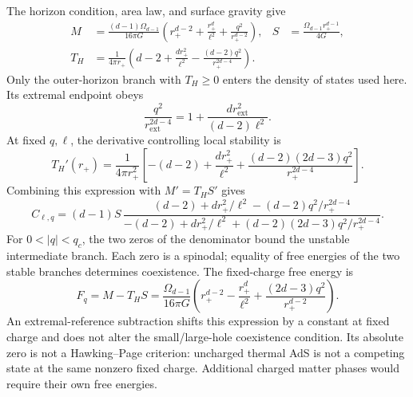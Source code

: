 \documentclass[11pt,letterpaper]{article}
\theoremstyle{plain}
\theoremstyle{definition}
\theoremstyle{remark}
\begin{document}
The horizon condition, area law, and surface gravity give
\begin{align}
 M&=\frac{(d-1)\Omega_{d-1}}{16\pi G}
   \left(r_+^{d-2}+\frac{r_+^d}{\ell^2}
                         +\frac{q^2}{r_+^{d-2}}\right),
 &S&=\frac{\Omega_{d-1}r_+^{d-1}}{4G},
 \label{eq11:charged_mass_entropy}\\
 T_H&=\frac{1}{4\pi r_+}
       \left(d-2+\frac{d r_+^2}{\ell^2}
                    -\frac{(d-2)q^2}{r_+^{2d-4}}\right).
 \label{eq11:charged_temperature}
\end{align}
Only the outer-horizon branch with $T_H\geq0$ enters the density of
states used here.  Its extremal endpoint obeys
\begin{equation}
 \frac{q^2}{r_{\mathrm{ext}}^{2d-4}}
   =1+\frac{d r_{\mathrm{ext}}^2}{(d-2)\ell^2}.
 \label{eq11:extremal_endpoint}
\end{equation}
At fixed $q,\ell$, the derivative controlling local stability is
\begin{equation}
 T_H'(r_+)=\frac{1}{4\pi r_+^2}
 \left[-(d-2)+\frac{d r_+^2}{\ell^2}
       +\frac{(d-2)(2d-3)q^2}{r_+^{2d-4}}\right].
 \label{eq11:charged_temperature_derivative}
\end{equation}
Combining this expression with $M'=T_HS'$ gives
\begin{equation}
 C_{\ell,q}=(d-1)S\,
 \frac{(d-2)+d r_+^2/\ell^2-(d-2)q^2/r_+^{2d-4}}
      {-(d-2)+d r_+^2/\ell^2+(d-2)(2d-3)q^2/r_+^{2d-4}}.
 \label{eq11:charged_capacity}
\end{equation}
For $0<|q|<q_c$, the two zeros of the denominator bound the unstable
intermediate branch.  Each zero is a spinodal; equality of free energies
of the two stable branches determines coexistence.  The fixed-charge
free energy is
\begin{equation}
 F_q=M-T_HS=\frac{\Omega_{d-1}}{16\pi G}
 \left(r_+^{d-2}-\frac{r_+^d}{\ell^2}
                      +\frac{(2d-3)q^2}{r_+^{d-2}}\right).
 \label{eq11:charged_free_energy}
\end{equation}
An extremal-reference subtraction shifts this expression by a constant
at fixed charge and does not alter the small/large-hole coexistence
condition.  Its absolute zero is not a Hawking--Page criterion: uncharged
thermal AdS is not a competing state at the same nonzero fixed charge.
Additional charged matter phases would require their own free energies.
\end{document}

